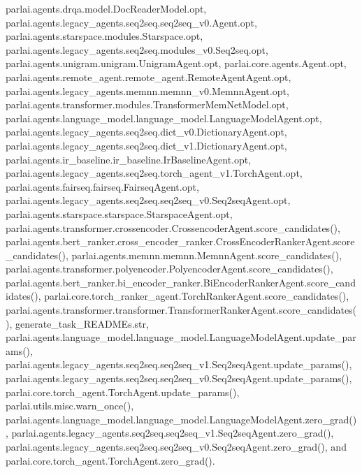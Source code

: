 parlai.\+agents.\+drqa.\+model.\+Doc\+Reader\+Model.\+opt, parlai.\+agents.\+legacy\+\_\+agents.\+seq2seq.\+seq2seq\+\_\+v0.\+Agent.\+opt, parlai.\+agents.\+starspace.\+modules.\+Starspace.\+opt, parlai.\+agents.\+legacy\+\_\+agents.\+seq2seq.\+modules\+\_\+v0.\+Seq2seq.\+opt, parlai.\+agents.\+unigram.\+unigram.\+Unigram\+Agent.\+opt, parlai.\+core.\+agents.\+Agent.\+opt, parlai.\+agents.\+remote\+\_\+agent.\+remote\+\_\+agent.\+Remote\+Agent\+Agent.\+opt, parlai.\+agents.\+legacy\+\_\+agents.\+memnn.\+memnn\+\_\+v0.\+Memnn\+Agent.\+opt, parlai.\+agents.\+transformer.\+modules.\+Transformer\+Mem\+Net\+Model.\+opt, parlai.\+agents.\+language\+\_\+model.\+language\+\_\+model.\+Language\+Model\+Agent.\+opt, parlai.\+agents.\+legacy\+\_\+agents.\+seq2seq.\+dict\+\_\+v0.\+Dictionary\+Agent.\+opt, parlai.\+agents.\+legacy\+\_\+agents.\+seq2seq.\+dict\+\_\+v1.\+Dictionary\+Agent.\+opt, parlai.\+agents.\+ir\+\_\+baseline.\+ir\+\_\+baseline.\+Ir\+Baseline\+Agent.\+opt, parlai.\+agents.\+legacy\+\_\+agents.\+seq2seq.\+torch\+\_\+agent\+\_\+v1.\+Torch\+Agent.\+opt, parlai.\+agents.\+fairseq.\+fairseq.\+Fairseq\+Agent.\+opt, parlai.\+agents.\+legacy\+\_\+agents.\+seq2seq.\+seq2seq\+\_\+v0.\+Seq2seq\+Agent.\+opt, parlai.\+agents.\+starspace.\+starspace.\+Starspace\+Agent.\+opt, parlai.\+agents.\+transformer.\+crossencoder.\+Crossencoder\+Agent.\+score\+\_\+candidates(), parlai.\+agents.\+bert\+\_\+ranker.\+cross\+\_\+encoder\+\_\+ranker.\+Cross\+Encoder\+Ranker\+Agent.\+score\+\_\+candidates(), parlai.\+agents.\+memnn.\+memnn.\+Memnn\+Agent.\+score\+\_\+candidates(), parlai.\+agents.\+transformer.\+polyencoder.\+Polyencoder\+Agent.\+score\+\_\+candidates(), parlai.\+agents.\+bert\+\_\+ranker.\+bi\+\_\+encoder\+\_\+ranker.\+Bi\+Encoder\+Ranker\+Agent.\+score\+\_\+candidates(), parlai.\+core.\+torch\+\_\+ranker\+\_\+agent.\+Torch\+Ranker\+Agent.\+score\+\_\+candidates(), parlai.\+agents.\+transformer.\+transformer.\+Transformer\+Ranker\+Agent.\+score\+\_\+candidates(), generate\+\_\+task\+\_\+\+R\+E\+A\+D\+M\+Es.\+str, parlai.\+agents.\+language\+\_\+model.\+language\+\_\+model.\+Language\+Model\+Agent.\+update\+\_\+params(), parlai.\+agents.\+legacy\+\_\+agents.\+seq2seq.\+seq2seq\+\_\+v1.\+Seq2seq\+Agent.\+update\+\_\+params(), parlai.\+agents.\+legacy\+\_\+agents.\+seq2seq.\+seq2seq\+\_\+v0.\+Seq2seq\+Agent.\+update\+\_\+params(), parlai.\+core.\+torch\+\_\+agent.\+Torch\+Agent.\+update\+\_\+params(), parlai.\+utils.\+misc.\+warn\+\_\+once(), parlai.\+agents.\+language\+\_\+model.\+language\+\_\+model.\+Language\+Model\+Agent.\+zero\+\_\+grad(), parlai.\+agents.\+legacy\+\_\+agents.\+seq2seq.\+seq2seq\+\_\+v1.\+Seq2seq\+Agent.\+zero\+\_\+grad(), parlai.\+agents.\+legacy\+\_\+agents.\+seq2seq.\+seq2seq\+\_\+v0.\+Seq2seq\+Agent.\+zero\+\_\+grad(), and parlai.\+core.\+torch\+\_\+agent.\+Torch\+Agent.\+zero\+\_\+grad().



